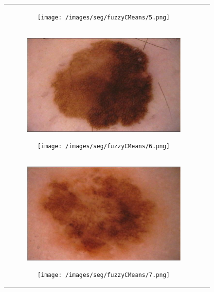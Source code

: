 \documentclass[a4paper, 10pt, conference]{ieeeconf}        %
\begin{document}
\begin{figure}[ht!]
\begin{tabular}{c c}
\begin{subfigure}{0.2\textwidth}
 \end{subfigure}
 \begin{subfigure}{0.2\textwidth}
 \texttt{[image: /images/seg/fuzzyCMeans/5.png]}\caption{}
 \end{subfigure}\\
 \begin{subfigure}{0.2\textwidth}
  \includegraphics[scale=0.15]{original06.JPG}\caption{}
  \end{subfigure}
  \begin{subfigure}{0.2\textwidth}
  \texttt{[image: /images/seg/fuzzyCMeans/6.png]}\caption{}
  \end{subfigure}\\
 \begin{subfigure}{0.2\textwidth}
  \includegraphics[scale=0.15]{original07.JPG}\caption{}
  \end{subfigure}
  \begin{subfigure}{0.2\textwidth}
  \texttt{[image: /images/seg/fuzzyCMeans/7.png]}\caption{}
  \end{subfigure}\\

\end{tabular}
\end{figure}
\end{document}
